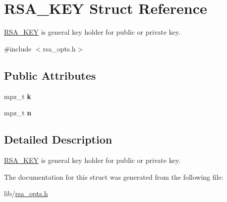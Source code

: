 \hypertarget{struct_r_s_a___k_e_y}{\section{R\-S\-A\-\_\-\-K\-E\-Y Struct Reference}
\label{struct_r_s_a___k_e_y}
}


\hyperlink{struct_r_s_a___k_e_y}{R\-S\-A\-\_\-\-K\-E\-Y} is general key holder for public or private key.  




{\ttfamily \#include $<$rsa\-\_\-opts.\-h$>$}

\subsection*{Public Attributes}
\begin{DoxyCompactItemize}
\item 
\hypertarget{struct_r_s_a___k_e_y_aca230295e9c1dae91084173d41bfa021}{mpz\-\_\-t {\bfseries k}}\label{struct_r_s_a___k_e_y_aca230295e9c1dae91084173d41bfa021}

\item 
\hypertarget{struct_r_s_a___k_e_y_a00349ee368001fe0f8d56391dd644e7e}{mpz\-\_\-t {\bfseries n}}\label{struct_r_s_a___k_e_y_a00349ee368001fe0f8d56391dd644e7e}

\end{DoxyCompactItemize}


\subsection{Detailed Description}
\hyperlink{struct_r_s_a___k_e_y}{R\-S\-A\-\_\-\-K\-E\-Y} is general key holder for public or private key. 

The documentation for this struct was generated from the following file\-:\begin{DoxyCompactItemize}
\item 
lib/\hyperlink{rsa__opts_8h}{rsa\-\_\-opts.\-h}\end{DoxyCompactItemize}
